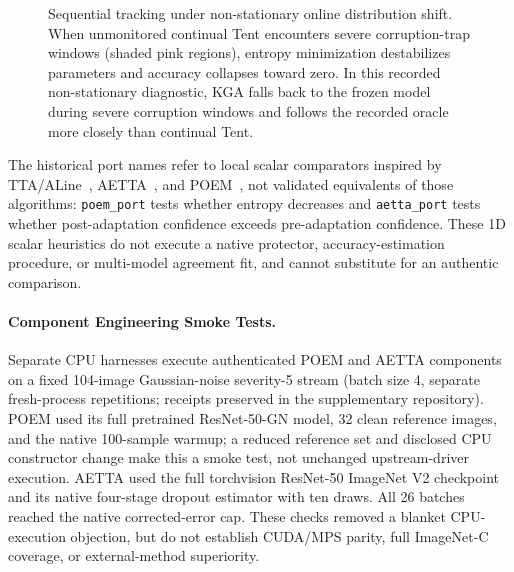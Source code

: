 \begin{figure}[t]
  \centering
  \caption{Sequential tracking under non-stationary online distribution shift. When unmonitored continual Tent encounters severe corruption-trap windows (shaded pink regions), entropy minimization destabilizes parameters and accuracy collapses toward zero. In this recorded non-stationary diagnostic, KGA falls back to the frozen model during severe corruption windows and follows the recorded oracle more closely than continual Tent.}
  \label{fig:cifar-tent-online}
\end{figure}
The historical port names refer to local scalar comparators inspired by TTA/ALine~\cite{kim2024ttaline},
AETTA~\cite{lee2024aetta}, and POEM~\cite{bar2024poem}, not validated equivalents of those algorithms:
\texttt{poem\_port} tests whether entropy decreases and \texttt{aetta\_port} tests whether post-adaptation
confidence exceeds pre-adaptation confidence. These 1D scalar heuristics do not execute a native protector,
accuracy-estimation procedure, or multi-model agreement fit, and cannot substitute for an authentic comparison.

\paragraph{Component Engineering Smoke Tests.}
Separate CPU harnesses execute authenticated POEM and AETTA components on a fixed 104-image
Gaussian-noise severity-5 stream (batch size 4, separate fresh-process repetitions; receipts preserved in the supplementary repository). POEM used its full pretrained ResNet-50-GN model,
32 clean reference images, and the native 100-sample warmup; a reduced reference set and disclosed CPU
constructor change make this a smoke test, not unchanged upstream-driver execution. AETTA used the full
torchvision ResNet-50 ImageNet V2 checkpoint and its native four-stage dropout estimator with ten draws.
All 26 batches reached the native corrected-error cap. These checks removed a blanket CPU-execution objection,
but do not establish CUDA/MPS parity, full ImageNet-C coverage, or external-method superiority.

